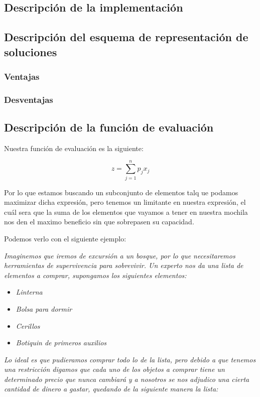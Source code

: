 \documentclass{article}
\begin{document}
\subsection*{Descripción de la implementación}

\subsection*{Descripción del esquema de representación de soluciones}

\subsubsection*{Ventajas}

\subsubsection*{Desventajas}

\subsection*{Descripción de la función de evaluación}
Nuestra función de evaluación es la siguiente:

\begin{equation*}
z = \sum_{j=1}^n p_jx_j
\end{equation*}

Por lo que estamos buscando un subconjunto de elementos talq ue podamos maximizar dicha expresión, pero tenemos un limitante en nuestra expresión, el cuál sera que la suma de los elementos que vayamos a tener en nuestra mochila nos den el maximo beneficio sin que sobrepasen su capacidad.

Podemos verlo con el siguiente ejemplo:

\textit{Imaginemos que iremos de excursión a un bosque, por lo que necesitaremos herramientas de supervivencia para sobrevivir. Un experto nos da una lista de elementos a comprar, supongamos los siguientes elementos:}

\begin{itemize}
	\item \textit{Linterna}
	\item \textit{Bolsa para dormir}
	\item \textit{Cerillos}
	\item \textit{Botiquin de primeros auxilios}
\end{itemize}

\textit{Lo ideal es que pudieramos comprar todo lo de la lista, pero debido a que tenemos una restricción digamos que cada uno de los objetos a comprar tiene un determinado precio que nunca cambiará y a nosotros se nos adjudico una cierta cantidad de dinero a gastar, quedando de la siguiente manera la lista:}
\end{document}
